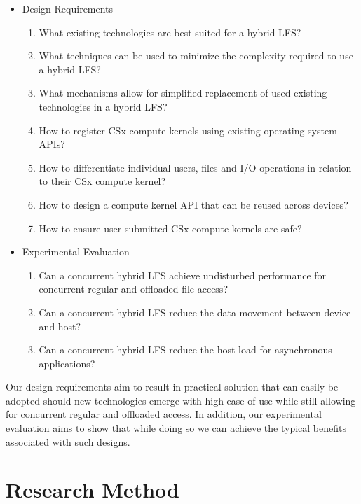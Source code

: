 \begin{itemize}
    \item Design Requirements
    \begin{enumerate}
        \item What existing technologies are best suited for a hybrid LFS?
        \item What techniques can be used to minimize the complexity required to
              use a hybrid LFS?
        \item What mechanisms allow for simplified replacement of used existing
              technologies in a hybrid LFS?
        \item How to register CSx compute kernels using existing operating 
              system APIs?
        \item How to differentiate individual users, files and I/O operations in
              relation to their CSx compute kernel?
        \item How to design a compute kernel API that can be reused across
              devices?
        \item How to ensure user submitted CSx compute kernels are safe?
    \end{enumerate}
    \item Experimental Evaluation
    \begin{enumerate}
        \item Can a concurrent hybrid LFS achieve undisturbed performance
              for concurrent regular and offloaded file access?
        \item Can a concurrent hybrid LFS reduce the data movement
              between device and host?
        \item Can a concurrent hybrid LFS reduce the host load for
              asynchronous applications?
    \end{enumerate}
\end{itemize}

Our design requirements aim to result in practical solution that can easily be
adopted should new technologies emerge with high ease of use while still
allowing for concurrent regular and offloaded access. In addition, our
experimental evaluation aims to show that while doing so we can achieve the
typical benefits associated with such designs.

\section{Research Method}

